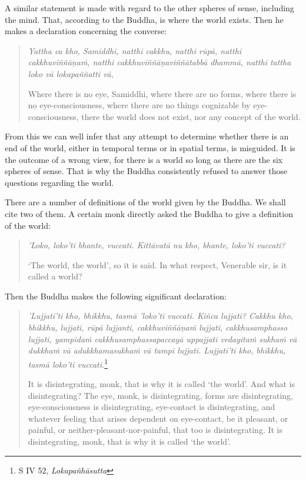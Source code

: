 A similar statement is made with regard to the other spheres of sense, including the mind. That, according to the Buddha, is where the world exists. Then he makes a declaration concerning the converse:

\begin{quote}
\emph{Yattha ca kho, Samiddhi, natthi cakkhu, natthi rūpā, natthi cakkhuviññāṇaṁ, natthi cakkhuviññāṇaviññātabbā dhammā, natthi tattha loko vā lokapaññatti vā},

Where there is no eye, Samiddhi, where there are no forms, where there is no eye-consciousness, where there are no things cognizable by eye-consciousness, there the world does not exist, nor any concept of the world.
\end{quote}

From this we can well infer that any attempt to determine whether there is an end of the world, either in temporal terms or in spatial terms, is misguided. It is the outcome of a wrong view, for there is a world so long as there are the six spheres of sense. That is why the Buddha consistently refused to answer those questions regarding the world.

There are a number of definitions of the world given by the Buddha. We shall cite two of them. A certain monk directly asked the Buddha to give a definition of the world:

\begin{quote}
\emph{'Loko, loko'ti bhante, vuccati. Kittāvatā nu kho, bhante, loko'ti vuccati?}

`The world, the world', so it is said. In what respect, Venerable sir, is it called a world?
\end{quote}

Then the Buddha makes the following significant declaration:

\begin{quote}
\emph{'Lujjatī'ti kho, bhikkhu, tasmā 'loko'ti vuccati. Kiñca lujjati? Cakkhu kho, bhikkhu, lujjati, rūpā lujjanti, cakkhuviññāṇaṁ lujjati, cakkhusamphasso lujjati, yampidaṁ cakkhusamphassapaccayā uppajjati vedayitaṁ sukhaṁ vā dukkhaṁ vā adukkhamasukhaṁ vā tampi lujjati. Lujjatī'ti kho, bhikkhu, tasmā loko'ti vuccati.}\footnote{S IV 52, \emph{Lokapañhāsutta}}

It is disintegrating, monk, that is why it is called `the world'. And what is disintegrating? The eye, monk, is disintegrating, forms are disintegrating, eye-consciousness is disintegrating, eye-contact is disintegrating, and whatever feeling that arises dependent on eye-contact, be it pleasant, or painful, or neither-pleasant-nor-painful, that too is disintegrating. It is disintegrating, monk, that is why it is called `the world'.
\end{quote}

